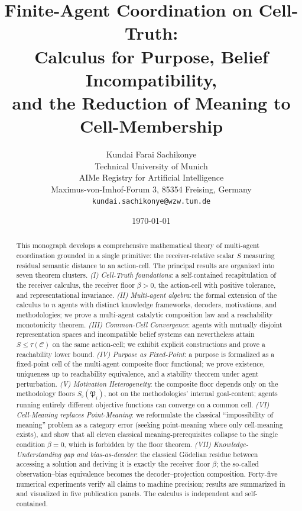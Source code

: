 \documentclass[11pt,twocolumn,a4paper]{article}
\title{\textbf{Finite-Agent Coordination on Cell-Truth:\\
Calculus for Purpose, Belief Incompatibility,\\
and the Reduction of Meaning to Cell-Membership}}
\author{Kundai Farai Sachikonye\\
Technical University of Munich\\
AIMe Registry for Artificial Intelligence\\
Maximus-von-Imhof-Forum 3, 85354 Freising, Germany\\
\texttt{kundai.sachikonye@wzw.tum.de}}
\date{\today}
\newcommand{\Cell}{\mathcal{C}}
\newcommand{\Method}{\mathfrak{P}}
\newcommand{\Sfloor}{S_{\flat}}
\begin{document}
\maketitle

\begin{abstract}
This monograph develops a comprehensive mathematical theory of multi-agent
coordination grounded in a single primitive: the receiver-relative scalar
$S$ measuring residual semantic distance to an action-cell. The principal
results are organized into seven theorem clusters.
\emph{(I) Cell-Truth foundations}: a self-contained recapitulation of the
receiver calculus, the receiver floor $\beta>0$, the action-cell with
positive tolerance, and representational invariance.
\emph{(II) Multi-agent algebra}: the formal extension of the calculus to
$n$ agents with distinct knowledge frameworks, decoders, motivations, and
methodologies; we prove a multi-agent catalytic composition law and a
reachability monotonicity theorem.
\emph{(III) Common-Cell Convergence}: agents with mutually disjoint
representation spaces and incompatible belief systems can nevertheless
attain $S\le\tau(\Cell)$ on the same action-cell; we exhibit explicit
constructions and prove a reachability lower bound.
\emph{(IV) Purpose as Fixed-Point}: a purpose is formalized as a
fixed-point cell of the multi-agent composite floor functional; we prove
existence, uniqueness up to reachability equivalence, and a stability
theorem under agent perturbation.
\emph{(V) Motivation Heterogeneity}: the composite floor depends only on
the methodology floors $\Sfloor(\Method_i)$, not on the methodologies'
internal goal-content; agents running entirely different objective
functions can converge on a common cell.
\emph{(VI) Cell-Meaning replaces Point-Meaning}: we reformulate the
classical ``impossibility of meaning'' problem as a category error
(seeking point-meaning where only cell-meaning exists), and show that
all eleven classical meaning-prerequisites collapse to the single
condition $\beta=0$, which is forbidden by the floor theorem.
\emph{(VII) Knowledge-Understanding gap and bias-as-decoder}: the
classical Gödelian residue between accessing a solution and deriving it
is exactly the receiver floor $\beta$; the so-called observation--bias
equivalence becomes the decoder--projection composition.
Forty-five numerical experiments verify all claims to machine precision;
results are summarized in  and visualized in five
publication panels. The calculus is independent and self-contained.
\end{abstract}
\end{document}
